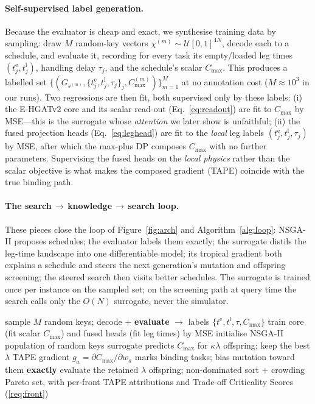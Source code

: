 \documentclass[11pt]{article}
\newcommand{\Cmax}{C_{\max}}
\begin{document}
\paragraph{Self-supervised label generation.} Because the evaluator is cheap and exact, we
synthesise training data by sampling: draw $M$ random-key vectors
$\chi^{(m)}\!\sim\!\mathcal U[0,1]^{4N}$, decode each to a schedule, and evaluate it, recording
for every task its empty/loaded leg times $(t^{\mathrm e}_j,t^{\mathrm l}_j)$, handling delay
$\tau_j$, and the schedule's scalar $\Cmax$. This produces a labelled set
$\{(G_{s^{(m)}},\{t^{\mathrm e}_j,t^{\mathrm l}_j,\tau_j\}_j,\Cmax^{(m)})\}_{m=1}^{M}$ at no
annotation cost ($M\!\approx\!10^3$ in our runs). Two regressions are then fit, both supervised
only by these labels: (i) the E-HGATv2 core and its scalar read-out
(Eq.~\ref{eq:readout}) are fit to $\Cmax$ by MSE---this is the surrogate whose \emph{attention}
we later show is unfaithful; (ii) the fused projection heads (Eq.~\ref{eq:leghead}) are fit to
the \emph{local} leg labels $(t^{\mathrm e}_j,t^{\mathrm l}_j,\tau_j)$ by MSE, after which the
max-plus DP composes $\Cmax$ with no further parameters. Supervising the fused heads on the
\emph{local physics} rather than the scalar objective is what makes the composed
gradient (TAPE) coincide with the true binding path.

\paragraph{The search$\,\to\,$knowledge$\,\to\,$search loop.} These pieces close the loop of
Figure~\ref{fig:arch} and Algorithm~\ref{alg:loop}: NSGA-II proposes schedules; the evaluator
labels them exactly; the surrogate distils the leg-time landscape into one differentiable
model; its tropical gradient both explains a schedule and steers the
next generation's mutation and offspring screening; the steered search then visits better
schedules. The surrogate is trained once per instance on the sampled set; on the
screening path at query time the search calls only the $O(N)$ surrogate, never the simulator.

\begin{algorithm}[t]
\caption{E-HGATv2 train-and-guide loop (per instance).}
\label{alg:loop}
\begin{algorithmic}[1]
\State sample $M$ random keys; decode + \textbf{evaluate} $\to$ labels $\{t^{\mathrm e},t^{\mathrm l},\tau,\Cmax\}$
\State train core (fit scalar $\Cmax$) and fused heads (fit leg times) by MSE 
\State initialise NSGA-II population of random keys
  \State surrogate predicts $\Cmax$ for $\kappa\lambda$ offspring; keep the best $\lambda$ 
  \State TAPE gradient $g_a=\partial\Cmax/\partial w_a$ marks binding tasks; bias mutation toward them
  \State \textbf{exactly} evaluate the retained $\lambda$ offspring; non-dominated sort + crowding
\EndFor
\State \Return Pareto set, with per-front TAPE attributions and Trade-off Criticality Scores (\ref{req:front})
\end{algorithmic}
\end{algorithm}
\end{document}
